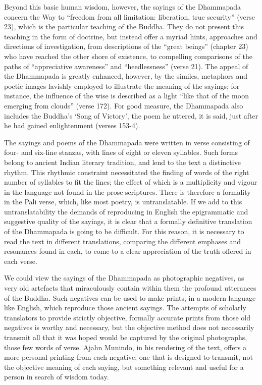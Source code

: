 Beyond this basic human wisdom, however, the sayings of the Dhammapada concern the Way to “freedom from all limitation: liberation, true security” (verse 23), which is the particular teaching of the Buddha. They do not present this teaching in the form of doctrine, but instead offer a myriad hints, approaches and directions of investigation, from descriptions of the “great beings” (chapter 23) who have reached the other shore of existence, to compelling comparisons of the paths of “appreciative awareness” and “heedlessness” (verse 21). The appeal of the Dhammapada is greatly enhanced, however, by the similes, metaphors and poetic images lavishly employed to illustrate the meaning of the sayings; for instance, the influence of the wise is described as a light “like that of the moon emerging from clouds” (verse 172). For good measure, the Dhammapada also includes the Buddha’s ‘Song of Victory’, the poem he uttered, it is said, just after he had gained enlightenment (verses 153-4).

The sayings and poems of the Dhammapada were written in verse consisting of four- and six-line stanzas, with lines of eight or eleven syllables. Such forms belong to ancient Indian literary tradition, and lend to the text a distinctive rhythm. This rhythmic constraint necessitated the finding of words of the right number of syllables to fit the lines; the effect of which is a multiplicity and vigour in the language not found in the prose scriptures. There is therefore a formality in the Pali verse, which, like most poetry, is untranslatable. If we add to this untranslatability the demands of reproducing in English the epigrammatic and suggestive quality of the sayings, it is clear that a formally definitive translation of the Dhammapada is going to be difficult. For this reason, it is necessary to read the text in different translations, comparing the different emphases and resonances found in each, to come to a clear appreciation of the truth offered in each verse.

We could view the sayings of the Dhammapada as photographic negatives, as very old artefacts that miraculously contain within them the profound utterances of the Buddha. Such negatives can be used to make prints, in a modern language like English, which reproduce those ancient sayings. The attempts of scholarly translators to provide strictly objective, formally accurate prints from those old negatives is worthy and necessary, but the objective method does not necessarily transmit all that it was hoped would be captured by the original photographs, those few words of verse. Ajahn Munindo, in his rendering of the text, offers a more personal printing from each negative; one that is designed to transmit, not the objective meaning of each saying, but something relevant and useful for a person in search of wisdom today.

